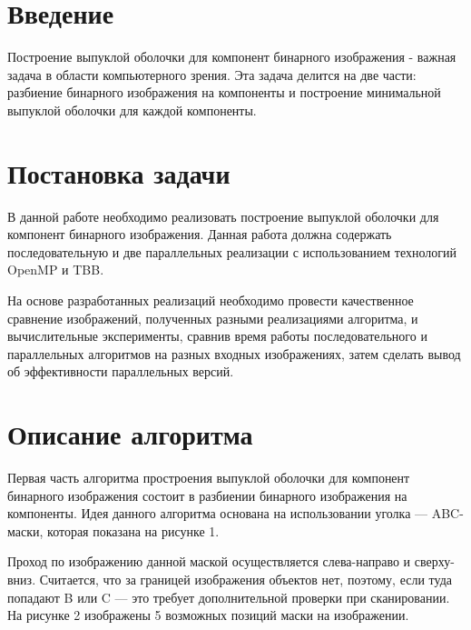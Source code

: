 \documentclass{report}
\begin{document}
\setcounter{page}{2}

\section*{Введение}
Построение выпуклой оболочки для компонент бинарного изображения - важная задача в области компьютерного зрения. Эта задача делится на две части: разбиение бинарного изображения на компоненты и построение минимальной выпуклой оболочки для каждой компоненты.
\newpage

\section*{Постановка задачи}
В данной работе необходимо реализовать построение выпуклой оболочки для компонент бинарного изображения. Данная работа должна содержать последовательную и две параллельных реализации с использованием технологий OpenMP и TBB. 
\par
На основе разработанных реализаций необходимо провести качественное сравнение изображений, полученных разными реализациями алгоритма, и вычислительные эксперименты, сравнив время работы последовательного и параллельных алгоритмов на разных входных изображениях, затем сделать вывод об эффективности параллельных версий.
\newpage

\section*{Описание алгоритма}
Первая часть алгоритма простроения выпуклой оболочки для компонент бинарного изображения состоит в разбиении бинарного изображения на компоненты. Идея данного алгоритма основана на использовании уголка — ABC-маски, которая показана на рисунке 1. 

Проход по изображению данной маской осуществляется слева-направо и сверху-вниз. Считается, что за границей изображения объектов нет, поэтому, если туда попадают B или C — это требует дополнительной проверки при сканировании. На рисунке 2 изображены 5 возможных позиций маски на изображении.
\end{document}

